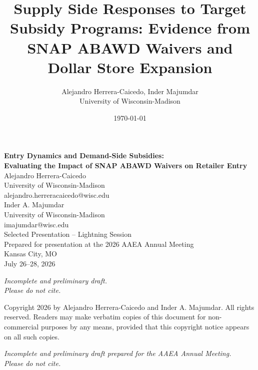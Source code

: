 \documentclass[12pt]{article}
\title{Supply Side Responses to Target Subsidy Programs: Evidence from SNAP ABAWD Waivers and Dollar Store Expansion\\[0.5em]}
\author{Alejandro Herrera-Caicedo, Inder Majumdar\\ University of Wisconsin-Madison}
\date{\today}
\begin{document}
\linenumbers

\begin{titlepage}
\centering


{\Large \textbf{Entry Dynamics and Demand-Side Subsidies:}}\\[0.25em]
{\Large \textbf{Evaluating the Impact of SNAP ABAWD Waivers on Retailer Entry}}\\[2.5em]


{\large Alejandro Herrera-Caicedo}\\
{\large University of Wisconsin-Madison}\\
{\large alejandro.herreracaicedo@wisc.edu}\\[1em]

{\large Inder A. Majumdar}\\
{\large University of Wisconsin-Madison}\\
{\large imajumdar@wisc.edu}\\[2.5em]

{\large Selected Presentation -- Lightning Session}\\[0.5em]
{\large Prepared for presentation at the 2026 AAEA Annual Meeting}\\
{\large Kansas City, MO}\\
{\large July 26--28, 2026}\\[2.5em]


\begin{center}
\textit{Incomplete and preliminary draft. \\
Please do not cite.}
\end{center}



\vfill

\begin{minipage}{0.9\textwidth}
\small
Copyright 2026 by Alejandro Herrera-Caicedo and Inder A. Majumdar. 
All rights reserved. Readers may make verbatim copies of this document for 
non-commercial purposes by any means, provided that this copyright notice 
appears on all such copies.
\end{minipage}

\end{titlepage}


\maketitle

\begin{center}
\textit{Incomplete and preliminary draft prepared for the AAEA Annual Meeting. \\
Please do not cite.}
\end{center}
\end{document}
